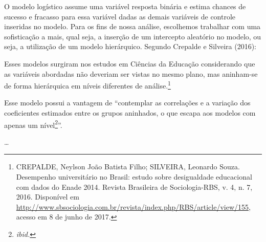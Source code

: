 \documentclass[a4paper, 12pt, openright, oneside, english, brazil, article]{abntex2}
\begin{document}
	O modelo logístico assume uma variável resposta binária e estima chances de sucesso e fracasso para essa variável dadas as demais variáveis de controle inseridas no modelo. Para os fins de nossa análise, escolhemos trabalhar com uma sofisticação a mais, qual seja, a inserção de um intercepto aleatório no modelo, ou seja, a utilização de um modelo hierárquico. Segundo Crepalde e Silveira (2016):
	
	\begin{citacao}
	Esses modelos surgiram nos estudos em Ciências da Educação considerando que as variáveis abordadas não deveriam ser vistas no mesmo plano, mas aninham-se de forma hierárquica em níveis diferentes de análise.\footnote{CREPALDE, Neylson João Batista Filho; SILVEIRA, Leonardo Souza. Desempenho universitário no Brasil: estudo sobre desigualdade educacional com dados do Enade 2014. Revista Brasileira de Sociologia-RBS, v. 4, n. 7, 2016. Disponível em \url{http://www.sbsociologia.com.br/revista/index.php/RBS/article/view/155}, acesso em 8 de junho de 2017.}		
	\end{citacao}
	
	Esse modelo possui a vantagem de ``contemplar as correlações e a variação dos coeficientes estimados entre os grupos aninhados, o que escapa aos modelos com apenas um nível\footnote{\textit{ibid.}}''.

	\ldots
	
	
	
\newpage

\thispagestyle{empty}
\cleardoublepage{}
\end{document}
